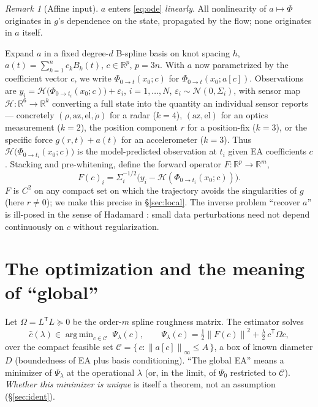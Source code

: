 \documentclass[11pt]{article}
\theoremstyle{plain}
\theoremstyle{definition}
\theoremstyle{remark}
\newtheorem*{remark}{Remark}
\newcommand{\R}{\mathbb{R}}
\newcommand{\norm}[1]{\left\lVert#1\right\rVert}
\newcommand{\trc}{\mathsf{T}}
\DeclareMathOperator*{\argmin}{arg\,min}
\begin{document}
\begin{remark}[Affine input]\label{rem:affine}
$a$ enters \eqref{eq:ode} \emph{linearly}. All nonlinearity of
$a\mapsto\Phi$ originates in $g$'s dependence on the state, propagated by
the flow; none originates in $a$ itself.
\end{remark}

Expand $a$ in a fixed degree-$d$ B-spline basis on knot spacing $h$,
$a(t)=\sum_{k=1}^{n}c_k B_k(t)$, $c\in\R^{p}$, $p=3n$. With $a$ now
parametrized by the coefficient vector $c$, we write
$\Phi_{0\to t}(x_0;c)$ for $\Phi_{0\to t}(x_0;a[c])$. Observations are
$y_i=\mathcal H\big(\Phi_{0\to t_i}(x_0;c)\big)+\varepsilon_i$,
$i=1,\dots,N$, $\varepsilon_i\sim\mathcal N(0,\Sigma_i)$, with sensor
map $\mathcal H:\R^{6}\to\R^{k}$ converting a full state into the
quantity an individual sensor reports --- concretely
$(\rho,\mathrm{az},\mathrm{el},\dot\rho)$ for a radar
($k=4$), $(\mathrm{az},\mathrm{el})$ for an optics measurement
($k=2$), the position component $r$ for a position-fix ($k=3$), or
the specific force $g(r,t)+a(t)$ for an accelerometer ($k=3$). Thus
$\mathcal H\big(\Phi_{0\to t_i}(x_0;c)\big)$ is the model-predicted
observation at $t_i$ given EA coefficients $c$. Stacking and
pre-whitening, define the forward operator $F:\R^{p}\to\R^{m}$,
\begin{equation}
F(c)_i=\Sigma_i^{-1/2}\big(y_i-\mathcal H(\Phi_{0\to t_i}(x_0;c))\big).
\label{eq:F}
\end{equation}
$F$ is $C^{2}$ on any compact set on which the trajectory avoids the
singularities of $g$ (here $r\neq0$); we make this precise in
\S\ref{sec:local}. The inverse problem ``recover $a$'' is
ill-posed in the sense of Hadamard \cite{tikhonov1977,engl1996}: small
data perturbations need not depend continuously on $c$ without
regularization.

\section{The optimization and the meaning of ``global''}\label{sec:opt}

Let $\Omega=L^{\trc}L\succeq0$ be the order-$m$ spline roughness matrix.
The estimator solves
\begin{equation}
\hat c(\lambda)\in\argmin_{c\in\mathcal C}\;
\Psi_\lambda(c),\qquad
\Psi_\lambda(c)=\tfrac12\norm{F(c)}^{2}+\tfrac{\lambda}{2}\,c^{\trc}\Omega c,
\label{eq:Psi}
\end{equation}
over the compact feasible set $\mathcal C=\{\,c:\norm{a[c]}_\infty\le
A\,\}$, a box of known diameter $D$ (boundedness of EA plus basis
conditioning). ``The global EA'' means a minimizer of $\Psi_{\lambda}$ at
the operational $\lambda$ (or, in the limit, of $\Psi_0$ restricted to
$\mathcal C$). \emph{Whether this minimizer is unique} is itself a
theorem, not an assumption (\S\ref{sec:ident}).
\end{document}
